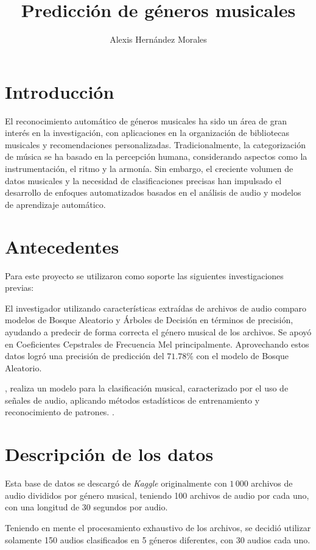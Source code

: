 \documentclass{article}
\title{Predicción de géneros musicales}
\author{Alexis Hernández Morales}
\affil{Facultad de Ciencias Físico Matemáticas, Universidad Autónoma de Nuevo León, San Nicolás de los Garza, México.}
\date{}
\begin{document}
\maketitle

\section{Introducción}
El reconocimiento automático de géneros musicales ha sido un área de gran interés en la investigación, con aplicaciones en la organización de bibliotecas musicales y recomendaciones personalizadas. Tradicionalmente, la categorización de música se ha basado en la percepción humana, considerando aspectos como la instrumentación, el ritmo y la armonía. Sin embargo, el creciente volumen de datos musicales y la necesidad de clasificaciones precisas han impulsado el desarrollo de enfoques automatizados basados en el análisis de audio y modelos de aprendizaje automático.


\section{Antecedentes}
Para este proyecto se utilizaron como soporte las siguientes investigaciones previas:

El investigador \citeauthor{Pavan} utilizando características extraídas de archivos de audio comparo modelos de Bosque Aleatorio y Árboles de Decisión en términos de precisión, ayudando a predecir de forma correcta el género musical de los archivos. Se apoyó en Coeficientes Cepstrales de Frecuencia Mel principalmente. Aprovechando estos datos logró una precisión de predicción del $71.78$\% con el modelo de Bosque Aleatorio\cite{Pavan}.

\citeauthor{Tzanetakis}, realiza un modelo para la clasificación musical, caracterizado por el uso de señales de audio, aplicando métodos estadísticos de entrenamiento y reconocimiento de patrones.    \cite{Tzanetakis}.


\section{Descripción de los datos}
Esta base de datos se descargó de \textit{Kaggle} originalmente con $1\,000$ archivos de audio divididos por género musical, teniendo 100 archivos de audio por cada uno, con una longitud de 30 segundos por audio.

Teniendo en mente el procesamiento exhaustivo de los archivos, se decidió utilizar solamente 150 audios clasificados en 5 géneros diferentes, con 30 audios cada uno.   
\end{document}
